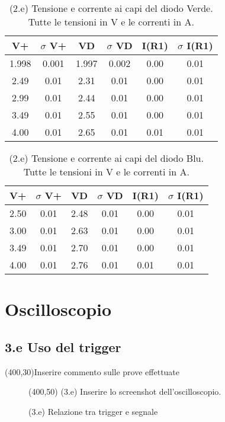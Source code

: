 \documentclass[10pt,a4paper]{article}
\newcommand{\exn}{\phantom{xxx}}
\begin{document}
\begin{table}[h]
\centering
\begin{tabular}{|c|c|c|c|c|c|}
\hline 
V+& $\sigma$ V+  & VD & $\sigma$ VD & I(R1)  & $\sigma$ I(R1) \\
\hline 
1.998 & 0.001 & 1.997 & 0.002 & 0.00 & 0.01 \\
2.49 & 0.01 & 2.31 & 0.01 & 0.00 & 0.01 \\
2.99 & 0.01 & 2.44 & 0.01 & 0.00 & 0.01 \\
3.49 & 0.01 & 2.55 & 0.01 & 0.00 & 0.01 \\
4.00 & 0.01 & 2.65 & 0.01 & 0.01 & 0.01 \\
\hline 
\end{tabular} 
\caption{(2.e) Tensione e corrente ai capi del diodo Verde. Tutte le tensioni in V e le correnti in A.\label{t:par1}}
\end{table}

\begin{table}[h]
\centering
\begin{tabular}{|c|c|c|c|c|c|}
\hline 
V+& $\sigma$ V+  & VD & $\sigma$ VD & I(R1)  & $\sigma$ I(R1) \\
\hline 
2.50 & 0.01 & 2.48 & 0.01 & 0.00 & 0.01 \\
3.00 & 0.01 & 2.63 & 0.01 & 0.00 & 0.01 \\
3.49 & 0.01 & 2.70 & 0.01 & 0.00 & 0.01 \\
4.00 & 0.01 & 2.76 & 0.01 & 0.01 & 0.01 \\
\hline 
\end{tabular} 
\caption{(2.e) Tensione e corrente ai capi del diodo Blu. Tutte le tensioni in V e le correnti in A.\label{t:par1}}
\end{table}


\section{Oscilloscopio}

\subsection*{3.e Uso del trigger}

\exn 
\par
\vspace{0.5cm}
\framebox(400,30){Inserire commento sulle prove effettuate }

\begin{figure}[h]
\centering
\framebox(400,50){ (3.e) Inserire lo screenshot dell'oscilloscopio. }
\caption{(3.e) Relazione tra trigger e segnale}
\end{figure}
\end{document}
